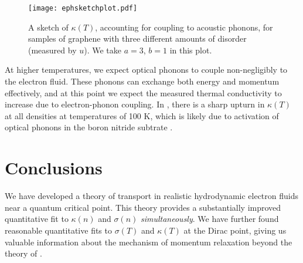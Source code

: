 \documentclass[10pt, oneside]{book}
\begin{document}
\begin{doublespace}
\begin{figure}[t]
\centering
\texttt{[image: ephsketchplot.pdf]}
\caption{A sketch of $\kappa(T)$, accounting for coupling to acoustic phonons, for samples of graphene with three different amounts of disorder (measured by $u$).  We take $a=3$, $b=1$ in this plot.}
\label{ephfig}
\end{figure}


At higher temperatures, we expect optical phonons to couple non-negligibly to the electron fluid.   These phonons can exchange both energy and momentum effectively,  and at this point we expect the measured thermal conductivity to increase due to electron-phonon coupling.   In \cite{Crossno1058},  there is a sharp upturn in $\kappa(T)$ at all densities at temperatures of 100 K, which is likely due to activation of optical phonons in the boron nitride subtrate \cite{crossno2}.


\section{Conclusions}

We have developed a theory of transport in realistic hydrodynamic electron fluids near a quantum critical point.    This theory provides a substantially improved quantitative fit to $\kappa(n)$ and $\sigma(n)$ \emph{simultaneously}.    We have further found reasonable quantitative fits to $\sigma(T)$ and $\kappa(T)$ at the Dirac point, giving us valuable information about the mechanism of momentum relaxation beyond the theory of \cite{hkms}.


\end{doublespace}
\end{document}
